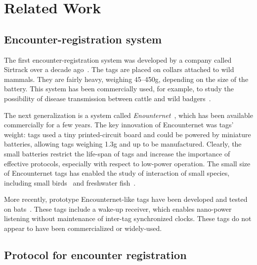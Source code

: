 \section{Related Work}
\label{sec:related-work}

\subsection{Encounter-registration system}
The first encounter-registration system was developed by a company called Sirtrack 
over a decade ago~\cite{Prangle2006NewRadiocolars}. The tags
are placed on collars attached to wild mammals. 
They are fairly heavy, weighing 45--450g, depending on the
size of the battery. %
This system has been commercially used, for example, to study 
the possibility of disease transmission between cattle 
and wild badgers~\cite{Bohm2009WildlifeLivestock}.

The next generalization is a system called {\em Enounternet}~\cite{Menhill2012NovelTelemetry,Rutz2012AutomatedMapping}, 
which has been available commercially for a few years. 
The key innovation of Encounternet was tags' weight: 
tags used a tiny printed-circuit board and
could be powered by miniature batteries, allowing tags weighing 1.3g and up to be manufactured. 
Clearly, the small batteries restrict the life-span of tags and increase the importance of effective protocols, 
especially with respect to low-power operation. 
The small size of Encounternet tags has enabled the study of interaction of small species, 
including small birds~\cite{Levin2015Performance} and freshwater fish~\cite{Tentelier2016FishNetwork}.

More recently, prototype Encounternet-like tags have been developed and tested on
bats~\cite{Ripperger2016ProximitySensing,dressler2016bats}. These tags include a wake-up receiver, which
enables nano-power listening without maintenance of inter-tag synchronized clocks. These tags  
do not appear to have been commercialized or widely-used.




\subsection{Protocol for encounter registration}



